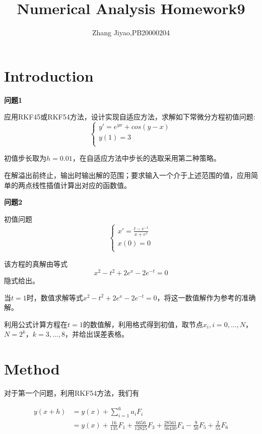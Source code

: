 \documentclass{article}
\title{Numerical Analysis Homework9}
\author{Zhang Jiyao,PB20000204}
\begin{document}
	\maketitle
	
	\section{Introduction}
    
    \textbf{问题1}
    
    应用RKF45或RKF54方法，设计实现自适应方法，求解如下常微分方程初值问题:
    $$	
    \left\{ 
    \begin{array}{lc}
    	y' = e^{yx}+cos(y-x) \\
        y(1) = 3 \\
    \end{array}
    \right.$$
    
    初值步长取为$h=0.01$，在自适应方法中步长的选取采用第二种策略。
    
    在解溢出前终止，输出时输出解的范围；要求输入一个介于上述范围的值，应用简单的两点线性插值计算出对应的函数值。
    
    \textbf{问题2}
    
    初值问题 
     $$	
    \left\{ 
    \begin{array}{lc}
    	x' = \frac{t-e^{-t}}{x+e^x} \\
    	x(0) = 0 \\
    \end{array}
    \right.$$
    
    该方程的真解由等式
    $$ x^2-t^2+2e^x-2e^{-t}=0$$
    隐式给出。
    
    当$t=1$时，数值求解等式$x^2-t^2+2e^x-2e^{-t}=0$，将这一数值解作为参考的准确解。
    
    利用公式计算方程在$t=1$的数值解，利用格式得到初值，取节点$x_i,i=0,...,N$，$N=2^k$，$k=3,...,8$，并给出误差表格。
	
	
	\section{Method}
	
	对于第一个问题，利用RKF54方法，我们有
	
	\begin{align*}
		y(x+h) &= y(x)+\sum_{i=1}^{6}a_iF_i \\
		&= y(x)+\frac{16}{135}F_1+\frac{6656}{12825}F_3+\frac{28561}{56430}F_4-\frac{9}{50}F_5+\frac{2}{55}F_6 \\
	\end{align*}
\end{document}
